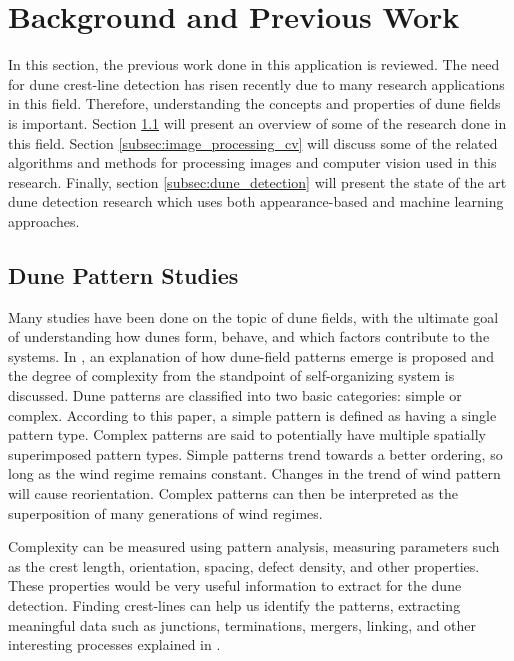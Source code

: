 \section{Background and Previous Work} \label{sec:background_perious_work}

In this section, the previous work done in this application is reviewed. The need for dune crest-line detection has risen recently due to many research applications in this field. Therefore, understanding the concepts and properties of dune fields is important. Section \ref{subsec:dune_pattern_studies} will present an overview of some of the research done in this field. Section \ref{subsec:image_processing_cv} will discuss some of the related algorithms and methods for processing images and computer vision used in this research. Finally, section \ref{subsec:dune_detection} will present the state of the art dune detection research which uses both appearance-based and machine learning approaches.

\subsection{Dune Pattern Studies} \label{subsec:dune_pattern_studies}

Many studies have been done on the topic of dune fields, with the ultimate goal of understanding how dunes form, behave, and which factors contribute to the systems. In \cite{Kocurek_Ewing}, an explanation of how dune-field patterns emerge is proposed and the degree of complexity from the standpoint of self-organizing system is discussed. Dune patterns are classified into two basic categories: simple or complex. According to this paper, a simple pattern is defined as having a single pattern type. Complex patterns are said to potentially have multiple spatially superimposed pattern types. Simple patterns trend towards a better ordering, so long as the wind regime remains constant. Changes in the trend of wind pattern will cause reorientation. Complex patterns can then be interpreted as the superposition of many generations of wind regimes.

Complexity can be measured using pattern analysis, measuring parameters such as the crest length, orientation, spacing,	defect density, and other properties. These properties would be very useful information to extract for the dune detection. Finding crest-lines	can help us identify the patterns, extracting meaningful data such as junctions, terminations, mergers, linking, and other interesting processes explained in \cite{Kocurek_Ewing}.

